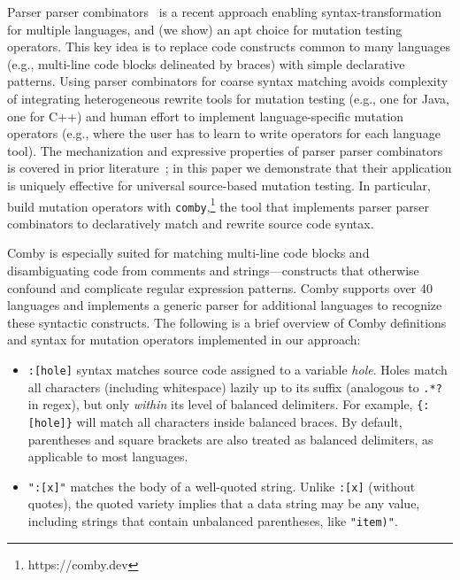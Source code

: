 \documentclass[sigconf,review, anonymous]{acmart}
\begin{document}
{Parser parser combinators~\cite{vanTonderPPC} is a recent approach enabling
syntax-transformation for multiple languages, and (we show) an apt choice for
mutation testing operators. This key idea is to replace code constructs
common to many languages (e.g., multi-line code blocks delineated by braces)
with simple declarative patterns. Using parser combinators for coarse syntax
matching avoids complexity of integrating heterogeneous rewrite tools for
mutation testing (e.g., one for Java, one for C++) and human effort to
implement language-specific mutation operators (e.g., where the user has to
learn to write operators for each language tool). The mechanization and
expressive properties of parser parser combinators is covered in prior
literature~\cite{vanTonderPPC}; in this paper we demonstrate that their application is
uniquely effective for universal source-based mutation testing. In particular,
build mutation operators with \texttt{comby},\footnote{https://comby.dev} the tool that implements parser parser
combinators to declaratively match and rewrite source code syntax. 

Comby is especially suited for matching multi-line code blocks and
disambiguating code from comments and strings---constructs that otherwise
confound and complicate regular expression patterns. Comby supports over 40
languages and implements a generic parser for additional languages to recognize
these syntactic constructs. The following is a brief overview of Comby
definitions and syntax for mutation operators implemented in our approach:

\begin{itemize}

\item \texttt{\small:[hole]} syntax matches source code assigned to a variable \emph{hole}. Holes match all characters (including whitespace) lazily up to its suffix (analogous to \texttt{\small.*?} in regex), but only \emph{within} its level of balanced delimiters. For example, \texttt{\small\{:[hole]\}} will match all characters inside balanced braces. By default, parentheses and square brackets are also treated as balanced delimiters, as applicable to most languages. 

\item \texttt{\small ":[x]"} matches the body of a well-quoted string. Unlike \texttt{\small :[x]} (without quotes), the quoted variety implies that a data string may be any value, including strings that contain unbalanced parentheses, like \texttt{\small "item)"}.


\end{itemize}}
\end{document}
